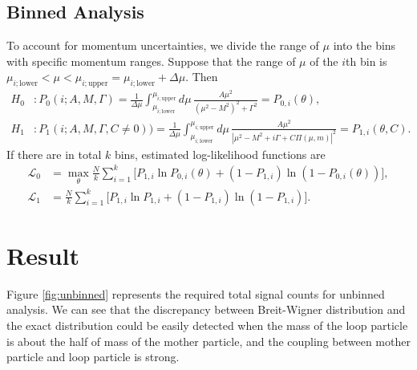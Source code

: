 \documentclass[10pt]{article}
\theoremstyle{definition}
\theoremstyle{remark}
\begin{document}
	\subsection{Binned Analysis}
	To account for momentum uncertainties, we divide the range of $\mu$ into the bins with specific momentum ranges.
	Suppose that the range of $\mu$ of the $i$th bin is $\mu_{i;\mathrm{lower}}<\mu<\mu_{i;\mathrm{upper}}=\mu_{i;\mathrm{lower}}+\Delta\mu$.
	Then
	\begin{align*}
		H_{0}&:P_{0}(i;A,M,\Gamma)=\frac{1}{\Delta\mu}\int_{\mu_{i;\mathrm{lower}}}^{\mu_{i;\mathrm{upper}}}d\mu\,\frac{A\mu^{2}}{(\mu^{2}-M^{2})^{2}+\Gamma^{2}}=P_{0,i}(\theta),\\
		H_{1}&:P_{1}(i;A,M,\Gamma,C\neq0))=\frac{1}{\Delta\mu}\int_{\mu_{i;\mathrm{lower}}}^{\mu_{i;\mathrm{upper}}}d\mu\,\frac{A\mu^{2}}{|\mu^{2}-M^{2}+i\Gamma+C\Pi(\mu,m)|^{2}}=P_{1,i}(\theta,C).
	\end{align*}
	If there are in total $k$ bins, estimated log-likelihood functions are
	\begin{align*}
		\mathcal{L}_{0}&=\max_{\theta}\frac{N}{k}\sum_{i=1}^{k}\Big[P_{1,i}\ln P_{0,i}(\theta)+(1-P_{1,i})\ln(1-P_{0,i}(\theta))\Big],\\
		\mathcal{L}_{1}&=\frac{N}{k}\sum_{i=1}^{k}\Big[P_{1,i}\ln P_{1,i}+(1-P_{1,i})\ln(1-P_{1,i})\Big].
	\end{align*}
	
	\section{Result}
	Figure \ref{fig:unbinned} represents the required total signal counts for unbinned analysis.
	We can see that the discrepancy between Breit-Wigner distribution and the exact distribution could be easily detected when the mass of the loop particle is about the half of mass of the mother particle, and the coupling between mother particle and loop particle is strong.
	
\end{document}
